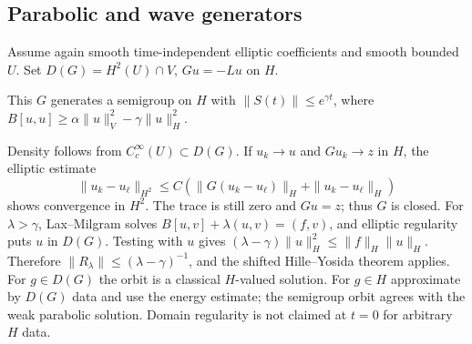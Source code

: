 \Needspace{55mm}
\subsection{Parabolic and wave generators}
Assume again smooth time-independent elliptic coefficients and smooth
bounded $U$. Set $D(G)=H^2(U)\cap V$, $Gu=-Lu$ on $H$.
\Needspace{55mm}
\begin{theorem}
This $G$ generates a semigroup on $H$ with $\|S(t)\|\leq e^{\gamma t}$,
where $B[u,u]\geq\alpha\|u\|_V^2-\gamma\|u\|_H^2$.
\end{theorem}
\begin{expandedproof}
Density follows from $C_c^\infty(U)\subset D(G)$.
If $u_k\to u$ and $Gu_k\to z$ in $H$, the elliptic estimate
\[
 \|u_k-u_\ell\|_{H^2}\leq C(\|G(u_k-u_\ell)\|_H+\|u_k-u_\ell\|_H)
\]
shows convergence in $H^2$. The trace is still zero and $Gu=z$; thus
$G$ is closed. For $\lambda>\gamma$, Lax--Milgram solves
$B[u,v]+\lambda(u,v)=(f,v)$, and elliptic regularity puts $u$ in $D(G)$.
Testing with $u$ gives
$(\lambda-\gamma)\|u\|_H^2\leq\|f\|_H\|u\|_H$.
Therefore $\|R_\lambda\|\leq(\lambda-\gamma)^{-1}$, and the shifted
Hille--Yosida theorem applies.
For $g\in D(G)$ the orbit is a classical $H$-valued solution. For $g\in H$
approximate by $D(G)$ data and use the energy estimate; the semigroup
orbit agrees with the weak parabolic solution. Domain regularity is not
claimed at $t=0$ for arbitrary $H$ data.
\end{expandedproof}
\Needspace{55mm}

